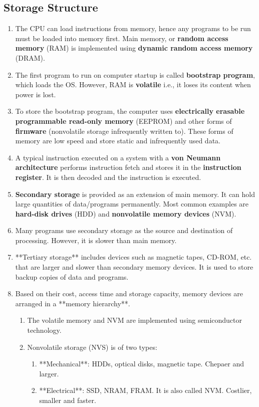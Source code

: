 \documentclass[journal,12pt,twocolumn]{IEEEtran}
\begin{document}
\subsection{Storage Structure}
\begin{enumerate}
    \item The CPU can load instructions from memory, hence any programs to be 
    run must be loaded into memory first. Main memory, or 
    \textbf{random access memory} (RAM) is implemented using 
    \textbf{dynamic random access memory} (DRAM).
    \item The first program to run on computer startup is called 
    \textbf{bootstrap program}, which loads the OS. However, RAM is 
    \textbf{volatile} i.e., it loses its content when power is lost.
    \item To store the bootstrap program, the computer uses
    \textbf{electrically erasable programmable read-only memory} (EEPROM) 
    and other forms of \textbf{firmware} (nonvolatile storage infrequently 
    written to). These forms of memory are low speed and store static and 
    infrequently used data.
    \item A typical instruction executed on a system with a 
    \textbf{von Neumann architecture} performs instruction fetch and stores it 
    in the \textbf{instruction register}. It is then decoded and the 
    instruction is executed.
    \item \textbf{Secondary storage} is provided as an extension of main memory. 
    It can hold large quantities of data/programs permanently. Most common 
    examples are \textbf{hard-disk drives} (HDD) and \textbf{nonvolatile memory 
    devices} (NVM).
    \item Many programs use secondary storage as the source and destination of processing. However, it is slower than main memory.
    \item **Tertiary storage** includes devices such as magnetic tapes, CD-ROM, etc. that are larger and slower than secondary memory devices. It is used to store backup copies of data and programs.
    \item Based on their cost, access time and storage capacity, memory devices are arranged in a **memory hierarchy**.
    \begin{enumerate}
        \item The volatile memory and NVM are implemented using semiconductor technology.
        \item Nonvolatile storage (NVS) is of two types:
        \begin{enumerate}
            \item **Mechanical**: HDDs, optical disks, magnetic tape. Chepaer and larger.
            \item **Electrical**: SSD, NRAM, FRAM. It is also called NVM. Costlier, smaller and faster.
        \end{enumerate}
    \end{enumerate}
\end{enumerate}
\end{document}
